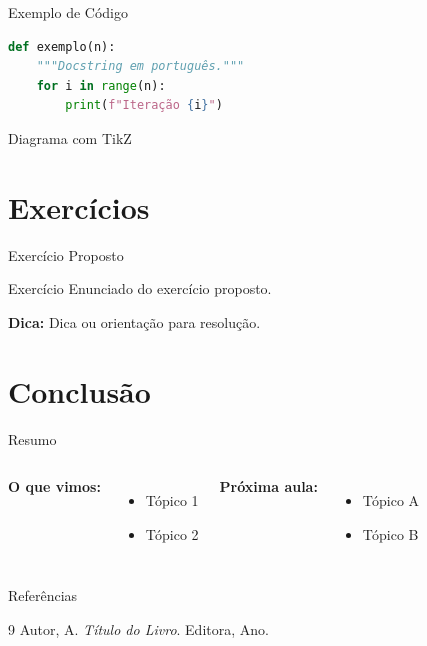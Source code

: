 \documentclass[aspectratio=169]{beamer}
\begin{document}
\begin{frame}{Exemplo de Código}
\begin{lstlisting}[language=Python, caption={Exemplo em Python}]
def exemplo(n):
    """Docstring em português."""
    for i in range(n):
        print(f"Iteração {i}")
\end{lstlisting}
\end{frame}

\begin{frame}{Diagrama com TikZ}
  \begin{center}
  \end{center}
\end{frame}

\section{Exercícios}

\begin{frame}{Exercício Proposto}
  \begin{alertblock}{Exercício}
    Enunciado do exercício proposto.
  \end{alertblock}

  \medskip
  \textbf{Dica:} Dica ou orientação para resolução.
\end{frame}

\section{Conclusão}

\begin{frame}{Resumo}
  \begin{columns}
      \textbf{O que vimos:}
      \begin{itemize}
        \item Tópico 1
        \item Tópico 2
      \end{itemize}
      \textbf{Próxima aula:}
      \begin{itemize}
        \item Tópico A
        \item Tópico B
      \end{itemize}
  \end{columns}
\end{frame}

\begin{frame}{Referências}
  \begin{thebibliography}{9}
      Autor, A.
      \newblock \textit{Título do Livro}.
      \newblock Editora, Ano.
  \end{thebibliography}
\end{frame}
\end{document}
